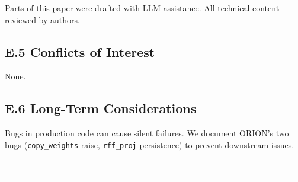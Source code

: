 Parts of this paper were drafted with LLM assistance. All technical content 
reviewed by authors.

\subsection{E.5 Conflicts of Interest}

None.

\subsection{E.6 Long-Term Considerations}

Bugs in production code can cause silent failures. We document ORION's 
two bugs (\texttt{copy\_weights} raise, \texttt{rff\_proj} persistence) to prevent 
downstream issues.
\begin{lstlisting}

---
\end{lstlisting}